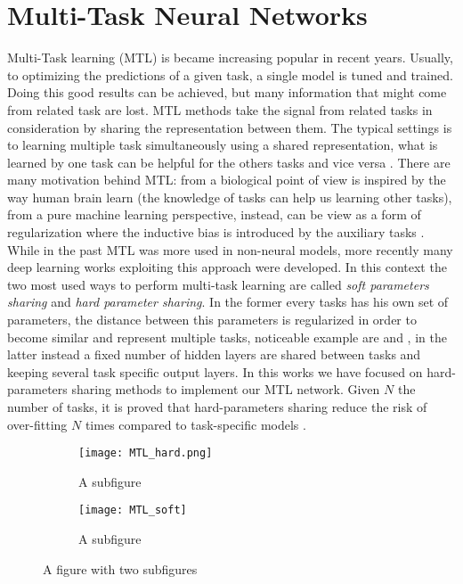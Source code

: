 \section{Multi-Task Neural Networks}\label{sec:MTLsection}
Multi-Task learning (MTL) is became increasing popular in recent years. Usually, to optimizing the predictions of a given task, a single model is tuned and trained. Doing this good results can be achieved, but many information that might come from related task are lost. MTL methods take the signal from related tasks in consideration by sharing the representation between them. The typical settings is to learning multiple task simultaneously using a shared representation, what is learned by one task can be helpful for the others tasks and vice versa \cite{Caruana97}. There are many motivation behind MTL: from a biological point of view is inspired by the way human brain learn (the knowledge of tasks can help us learning other tasks), from a pure machine learning perspective, instead, can be view as a form of regularization where the inductive bias is introduced by the auxiliary tasks \cite{Ruder2017}. While in the past MTL was more used in non-neural models, more recently many deep learning works exploiting this approach were developed. In this context the two most used ways to perform multi-task learning are called \emph{soft parameters sharing} and \emph{hard parameter sharing}. In the former every tasks has his own set of parameters, the distance between this parameters is regularized in order to become similar and represent multiple tasks, noticeable example are \cite{duong-etal-2015-low} and \cite{yang2016trace}, in the latter instead a fixed number of hidden layers are shared between tasks and keeping several task specific output layers. In this works we have focused on hard-parameters sharing methods to implement our MTL network. Given $N$ the number of tasks, it is proved that hard-parameters sharing reduce the risk of over-fitting $N$ times compared to task-specific models \cite{baxter1997}.
\begin{figure}
\centering
\begin{subfigure}{.5\textwidth}
  \centering
  \texttt{[image: MTL\_hard.png]}
  \caption{A subfigure}
  \label{fig:sub1}
\end{subfigure}%
\begin{subfigure}{.5\textwidth}
  \centering
  \texttt{[image: MTL\_soft]}
  \caption{A subfigure}
  \label{fig:sub2}
\end{subfigure}
\caption{A figure with two subfigures}
\label{fig:test}
\end{figure}

